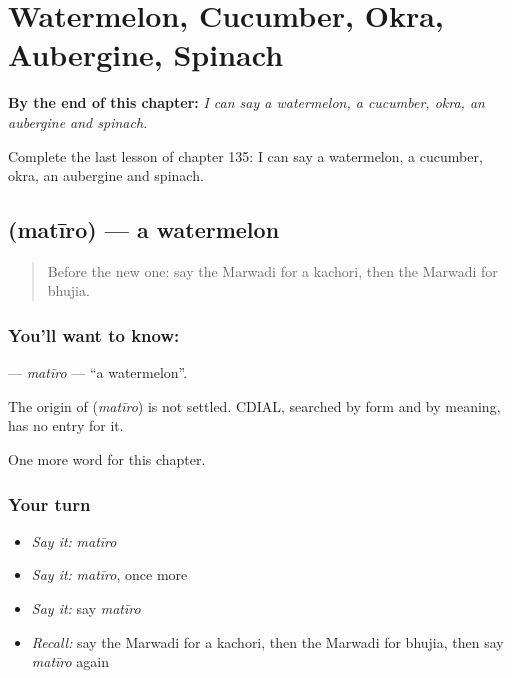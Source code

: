
\chapter{Watermelon, Cucumber, Okra, Aubergine, Spinach}
\label{ch:mw-watermelon-cucumber-okra-aubergine-spinach}

\begin{chapteropening}
\textbf{By the end of this chapter:} \emph{I can say a watermelon, a cucumber, okra, an aubergine and spinach.}

Complete the last lesson of chapter 135: I can say a watermelon, a cucumber, okra, an aubergine and spinach.
\end{chapteropening}

\section[\texorpdfstring{\mw{मतीरो} (matīro)}{मतीरो (matīro)}]{ (matīro) — a watermelon}

\label{lesson:MW-C135-matiro}



\begin{quote}
Before the new one: say the Marwadi for a kachori, then the Marwadi for bhujia.
\end{quote}

\subsection*{You'll want to know: }
\textbf{} — \emph{matīro} — \textquotedblleft{}a watermelon\textquotedblright{}.

\begin{cousinweb}
The origin of \textbf{} (\emph{matīro}) is not settled. CDIAL, searched by form and by meaning, has no entry for it.
\end{cousinweb}

\begin{grammarlens}[title={What you've built}]
One more word for this chapter.
\end{grammarlens}

\subsection*{Your turn}
\begin{itemize}
\raggedright
  \item \emph{Say it:} \emph{matīro}
  \item \emph{Say it:} \emph{matīro}, once more
  \item \emph{Say it:} say \emph{matīro}
  \item \emph{Recall:} say the Marwadi for a kachori, then the Marwadi for bhujia, then say \emph{matīro} again
\end{itemize}

